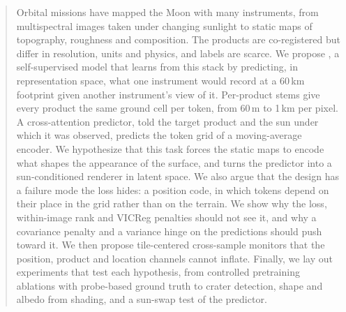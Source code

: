\begin{abstract}
Orbital missions have mapped the Moon with many instruments, from multispectral images taken under changing sunlight to static maps of topography, roughness and composition. The products are co-registered but differ in resolution, units and physics, and labels are scarce. We propose \method, a self-supervised model that learns from this stack by predicting, in representation space, what one instrument would record at a 60\,km footprint given another instrument's view of it. Per-product stems give every product the same ground cell per token, from 60\,m to 1\,km per pixel. A cross-attention predictor, told the target product and the sun under which it was observed, predicts the token grid of a moving-average encoder. We hypothesize that this task forces the static maps to encode what shapes the appearance of the surface, and turns the predictor into a sun-conditioned renderer in latent space. We also argue that the design has a failure mode the loss hides: a position code, in which tokens depend on their place in the grid rather than on the terrain. We show why the loss, within-image rank and VICReg penalties should not see it, and why a covariance penalty and a variance hinge on the predictions should push toward it. We then propose tile-centered cross-sample monitors that the position, product and location channels cannot inflate. Finally, we lay out experiments that test each hypothesis, from controlled pretraining ablations with probe-based ground truth to crater detection, shape and albedo from shading, and a sun-swap test of the predictor. 
\end{abstract}
